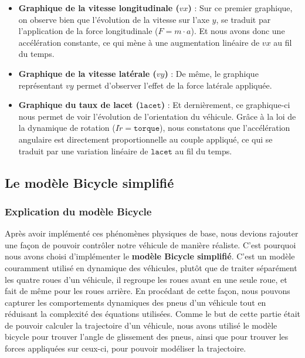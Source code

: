 \begin{itemize}
    \item \textbf{Graphique de la vitesse longitudinale ($vx$)} : Sur ce premier graphique, on observe bien que l'évolution de la vitesse sur l'axe $y$, se traduit par l'application de la force longitudinale ($ F = m \cdot a $). Et nous avons donc une accélération constante, ce qui mène à une augmentation linéaire de $vx$ au fil du temps.

    \item \textbf{Graphique de la vitesse latérale ($vy$)} : De même, le graphique représentant $vy$ permet d'observer l'effet de la force latérale appliquée.

    \item \textbf{Graphique du taux de lacet ({$\texttt{lacet}$})} : Et dernièrement, ce graphique-ci nous permet de voir l'évolution de l'orientation du véhicule. Grâce à la loi de la dynamique de rotation ($I\dot{r} = \texttt{torque}$), nous constatons que l'accélération angulaire est directement proportionnelle au couple appliqué, ce qui se traduit par une variation linéaire de $\texttt{lacet}$ au fil du temps.
\end{itemize}

\subsection{Le modèle Bicycle simplifié}
\subsubsection{Explication du modèle Bicycle}
Après avoir implémenté ces phénomènes physiques de base, nous devions rajouter une façon de pouvoir contrôler notre véhicule de manière réaliste. C'est pourquoi nous avons choisi d'implémenter le \textbf{modèle Bicycle simplifié}. C'est un modèle couramment utilisé en dynamique des véhicules, plutôt que de traiter séparément les quatre roues d'un véhicule, il regroupe les roues avant en une seule roue, et fait de même pour les roues arrière. En procédant de cette façon, nous pouvons capturer les comportements dynamiques des pneus d'un véhicule tout en réduisant la complexité des équations utilisées. Comme le but de cette partie était de pouvoir calculer la trajectoire d'un véhicule, nous avons utilisé le modèle bicycle pour trouver l'angle de glissement des pneus, ainsi que pour trouver les forces appliquées sur ceux-ci, pour pouvoir modéliser la trajectoire.


